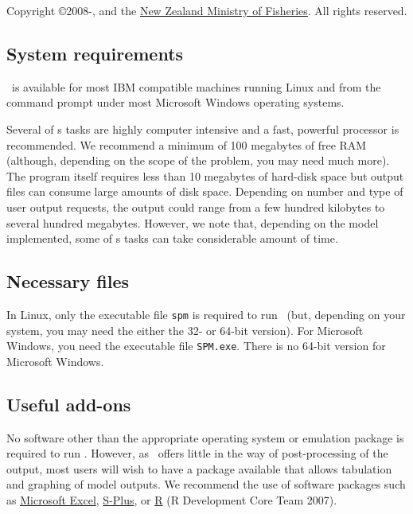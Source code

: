 Copyright \copyright 2008-\SourceControlYearSPM, \href{http://www.niwa.co.nz}{\Organisation} and the \href{http://www.fish.govt.nz}{New Zealand Ministry of Fisheries}. All rights reserved. 

\subsection{System requirements}

\SPM\ is available for most IBM compatible machines running Linux and from the command prompt under most Microsoft Windows operating systems. 

Several of \SPM s tasks are highly computer intensive and a fast, powerful processor is recommended. We recommend a minimum of 100 megabytes of free RAM (although, depending on the scope of the problem, you may need much more). The program itself requires less than 10 megabytes of hard-disk space but output files can consume large amounts of disk space. Depending on number and type of user output requests, the output could range from a few hundred kilobytes to several hundred megabytes. However, we note that, depending on the model implemented, some of \SPM s tasks can take considerable amount of time.

\subsection{Necessary files}

In Linux, only the executable file \texttt{spm} is required to run \SPM\ (but, depending on your system, you may need the either the 32- or 64-bit version). For Microsoft Windows, you need the executable file \texttt{SPM.exe}. There is no 64-bit version for Microsoft Windows.

\subsection{Useful add-ons}

No software other than the appropriate operating system or emulation package is required to run \SPM. However, as \SPM\ offers little in the way of  post-processing of the output, most users will wish to have a package available that allows tabulation and graphing of model outputs. We recommend the use of software packages such as \href{http://www.microsoft.com}{Microsoft Excel}, \href{http://www.insightful.com}{S-Plus}, or \href{http://www.r-project.org}{R} (R Development Core Team 2007). 

